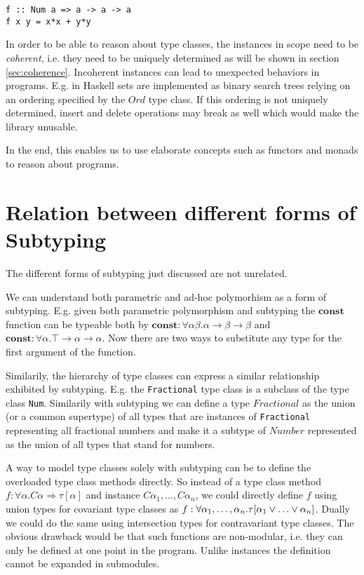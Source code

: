 \begin{verbatim}
f :: Num a => a -> a -> a
f x y = x*x + y*y
\end{verbatim}


In order to be able to reason about type classes, the instances in scope need to be \emph{coherent}, i.e. they need to be uniquely determined as will be shown in section \ref{sec:coherence}.
Incoherent instances can lead to unexpected behaviors in programs.
E.g. in Haskell sets are implemented as binary search trees relying on an ordering specified by the $Ord$ type class.
If this ordering is not uniquely determined, insert and delete operations may break as well which would make the library unusable. \cite{Kilpatrick2019-cy}

In the end, this enables us to use elaborate concepts such as functors and monads to reason about programs.


\section{Relation between different forms of Subtyping}\label{sec:relations}

The different forms of subtyping just discussed are not unrelated.

We can understand both parametric and ad-hoc polymorhism as a form of subtyping.
E.g. given both parametric polymorphism and subtyping the $\mathbf{const}$ function can be typeable both by
$\mathbf{const} : \forall \alpha \beta. \alpha \to \beta \to \beta$ and $\mathbf{const} : \forall \alpha. \top \to \alpha \to \alpha$.
Now there are two ways to substitute any type for the first argument of the function.

Similarily, the hierarchy of type classes can express a similar relationship exhibited by subtyping.
E.g. the \texttt{Fractional} type class is a subclass of the type class \texttt{Num}.
Similarily with subtyping we can define a type $\mathit{Fractional}$ as the union (or a common supertype) of all types that are instances of \texttt{Fractional} representing all fractional numbers and make it a subtype of $\mathit{Number}$ represented as the union of all types that stand for numbers.

A way to model type classes solely with subtyping can be to define the overloaded type class methods directly.
So instead of a type class method $f : \forall \alpha. C \alpha \Rightarrow \tau[\alpha]$ and instance $C \alpha_1, \dots, C \alpha_n$,
we could directly define $f$ using union types for covariant type classes as $f : \forall \alpha_1,\dots,\alpha_n. \tau[\alpha_1 \join \dots \join \alpha_n]$.
Dually we could do the same using intersection types for contravariant type classes.
The obvious drawback would be that such functions are non-modular, i.e. they can only be defined at one point in the program.
Unlike instances the definition cannot be expanded in submodules.

